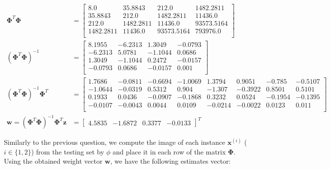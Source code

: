 \documentclass{exam}
\begin{document}
\begin{questions}
        \begin{align*}
            \boldsymbol{\Phi}^T\boldsymbol{\Phi} &= 
            \begin{bmatrix}
                8.0 & 35.8843 & 212.0 & 1482.2811 \\
                35.8843 & 212.0 & 1482.2811 & 11436.0 \\
                212.0 & 1482.2811 & 11436.0 & 93573.5164 \\
                1482.2811 & 11436.0 & 93573.5164 & 793976.0 \\
            \end{bmatrix} \\
            (\boldsymbol{\Phi}^T\boldsymbol{\Phi})^{-1} &= 
            \begin{bmatrix}
                8.1955 & -6.2313 & 1.3049 & -0.0793 \\
                -6.2313 & 5.0781 & -1.1044 & 0.0686 \\
                1.3049 & -1.1044 & 0.2472 & -0.0157 \\
                -0.0793 & 0.0686 & -0.0157 & 0.001 \\
            \end{bmatrix} \\
            (\boldsymbol{\Phi}^T\boldsymbol{\Phi})^{-1}\boldsymbol{\Phi}^T&=
            \begin{bmatrix}
                1.7686 & -0.0811 & -0.6694 & -1.0069 & 1.3794 & 0.9051 & -0.785 & -0.5107 \\
                -1.0644 & -0.0319 & 0.5312 & 0.904 & -1.307 & -0.3922 & 0.8501 & 0.5101 \\
                0.1933 & 0.0436 & -0.0907 & -0.1868 & 0.3232 & 0.0524 & -0.1954 & -0.1395 \\
                -0.0107 & -0.0043 & 0.0044 & 0.0109 & -0.0214 & -0.0022 & 0.0123 & 0.011 \\               
            \end{bmatrix} \\
            \textbf{w} = (\boldsymbol{\Phi}^T\boldsymbol{\Phi})^{-1}\boldsymbol{\Phi}^T\textbf{z} &= 
            \begin{bmatrix}
                4.5835 & -1.6872 & 0.3377 & -0.0133
            \end{bmatrix} ^T
        \end{align*}
        \item Similarly to the previous question, we compute the image of each instance $\textbf{x}^{(i)}$ ($i \in \{1,2\}$) from the testing set by $\phi$ and place it in each row of the matrix $\boldsymbol{\Phi}$. Using the obtained weight vector $\textbf{w}$, we have the following estimates vector:

\end{questions}
\end{document}
